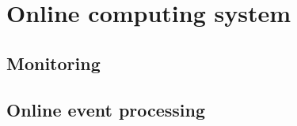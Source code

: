 
\section[Online computing system (David)]{Online computing system \label{sec:online}}
\subsection{Monitoring \label{sec:onlinemonitoring}}
\subsection{Online event processing \label{sec:onlineprocessing}}

